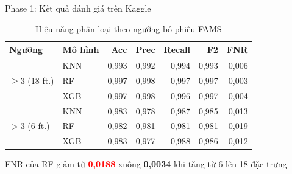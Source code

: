 \documentclass[aspectratio=169,12pt]{beamer}
\newcommand{\good}[1]{\textcolor{mygreen}{\textbf{#1}}}
\newcommand{\bad}[1]{\textcolor{red}{\textbf{#1}}}
\begin{document}
\begin{frame}{Phase 1: Kết quả đánh giá trên Kaggle}
  \begin{table}
    \centering
    \small
    \caption{Hiệu năng phân loại theo ngưỡng bỏ phiếu FAMS}
    \begin{tabular}{llrrrrr}
      \toprule
      \textbf{Ngưỡng} & \textbf{Mô hình} & \textbf{Acc} & \textbf{Prec} & \textbf{Recall} & \textbf{F2} & \textbf{FNR}\\
      \midrule
      \multirow{3}{*}{$\geq3$ (18 ft.)}
        & KNN & 0,993 & 0,992 & 0,994 & 0,993 & 0,006 \\
        & RF  & 0,997 & 0,998 & 0,997 & 0,997 & 0,003 \\
        & XGB & 0,997 & 0,998 & 0,996 & 0,997 & 0,004 \\
      \midrule
      \multirow{3}{*}{$>3$ (6 ft.)}
        & KNN & 0,983 & 0,978 & 0,987 & 0,985 & 0,013 \\
        & RF  & 0,982 & 0,981 & 0,981 & 0,981 & 0,019 \\
        & XGB & 0,983 & 0,977 & 0,988 & 0,986 & 0,012 \\
      \bottomrule
    \end{tabular}
  \end{table}
  \vspace{0.3em}
  \begin{center}
    \small FNR của RF giảm từ \bad{0,0188} xuống \good{0,0034} khi tăng từ 6 lên 18 đặc trưng
  \end{center}
\end{frame}
\end{document}
